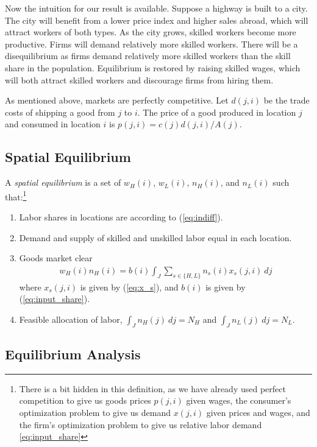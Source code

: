 \documentclass{article}
\begin{document}
Now the intuition for our result is available.  Suppose a highway is built to a city.  The city will benefit from a lower price index and higher sales abroad, which will attract workers of both types.  As the city grows, skilled workers become more productive.  Firms will demand relatively more skilled workers.  There will be a disequilibrium as firms demand relatively more skilled workers than the skill share in the population.  Equilibrium is restored by raising skilled wages, which will both attract skilled workers and discourage firms from hiring them.

As mentioned above, markets are perfectly competitive. Let $d(j,i)$ be the trade costs of shipping a good from $j$ to $i$. The price of a good produced in location $j$ and consumed in location $i$ is $p(j,i) = c(j)d(j,i)/A(j)$. 

\subsection{Spatial Equilibrium}

A \textit{spatial equilibrium} is a set of $w_H(i)$, $w_L(i)$, $n_H(i)$, and $n_L(i)$ such that:\footnote{There is a bit hidden in this definition, as we have already used perfect competition to give us goods prices $p(j,i)$ given wages, the consumer's optimization problem to give us demand $x(j,i)$ given prices and wages, and the firm's optimization problem to give us relative labor demand \eqref{eq:input_share}}
\begin{enumerate}
\item Labor shares in locations are according to (\ref{eq:indiff}).
\item Demand and supply of skilled and unskilled labor equal in each location.
\item Goods market clear
\begin{eqnarray}\label{eq:goods_mkt_clear}
	w_H(i) n_H(i) =  b(i) \int_J \sum_{s \in \{H,L\}} n_s(i)x_s(j,i) ~dj 
\end{eqnarray}
where $x_s(j,i)$ is given by (\ref{eq:x_s}), and $b(i)$ is given by (\ref{eq:input_share}).
\item Feasible allocation of labor, $\int_J n_H(j) ~dj = N_H$ and $\int_J n_L(j) ~dj = N_L$.
\end{enumerate}

\vspace{5mm}
\subsection{Equilibrium Analysis}
\end{document}
